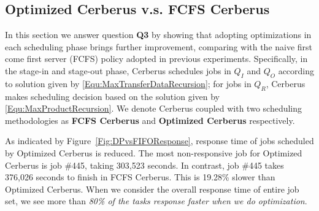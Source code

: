 \subsection{Optimized Cerberus v.s. FCFS Cerberus}

In this section we answer question \textbf{Q3} by showing that
adopting optimizations in each scheduling phase brings further improvement,
comparing with the naive first come first server (FCFS) policy adopted in previous experiments.
Specifically, in the stage-in and stage-out phase, Cerberus schedules jobs in $Q_I$ and $Q_O$
according to solution given by \ref{Equ:MaxTransferDataRecursion};
for jobs in $Q_R$, Cerberus makes scheduling decision
based on the solution given by \ref{Equ:MaxProductRecursion}. %
We denote Cerberus coupled with two scheduling methodologies 
as \textbf{FCFS Cerberus} and \textbf{Optimized Cerberus} respectively.

As indicated by Figure~\ref{Fig:DPvsFIFOResponse}, response time of
jobs scheduled by Optimized Cerberus is reduced.
The most non-responsive job for Optimized Cerberus is job \#445,
taking 303,523 seconds.
In contrast, job \#445 takes 376,026 seconds to finish in FCFS Cerberus.
This is 19.28\% slower than Optimized Cerberus.
When we consider the overall response time of entire job set,
we see more than \textit{80\% of the tasks response faster when we do optimization}.


